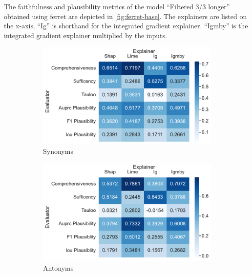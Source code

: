 The faithfulness and plausibility metrics of the model \enquote{Filtered 3/3 longer} obtained using ferret are depicted in \autoref{fig:ferret-base}. The explainers are listed on the x-axis. \enquote{Ig} is shorthand for the integrated gradient explainer. \enquote{Igmby} is the integrated gradient explainer multiplied by the inputs.

\begin{figure}[t!]
    \centering
    \begin{subfigure}{0.49\textwidth}
        \includegraphics[width=\textwidth]{./images/ferret_heatmaps_phenomena/filtered_3_3_longer/synonym.pdf}
        \caption{Synonyms}
    \end{subfigure}
    \begin{subfigure}{0.49\textwidth}
        \includegraphics[width=\textwidth]{./images/ferret_heatmaps_phenomena/filtered_3_3_longer/antonym.pdf}
        \caption{Antonyms}
    \end{subfigure}
    \begin{subfigure}{0.49\textwidth}

\end{subfigure}
\end{figure}
